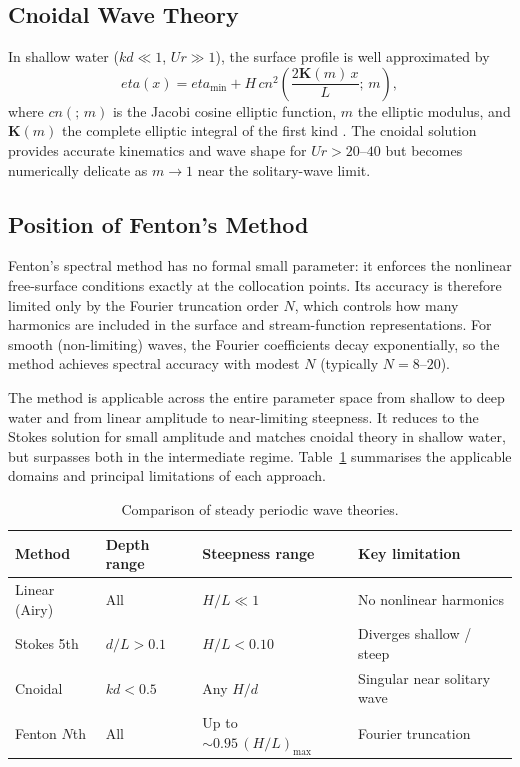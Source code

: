 \documentclass[journal,10pt,twocolumn]{IEEEtran}
\def\eta{eta}%
\def\mathrm#1{#1}%
\def\cdot{}%
\begin{document}
\subsection{Cnoidal Wave Theory}

In shallow water ($kd \ll 1$, $Ur \gg 1$), the surface profile is
well approximated by
\begin{equation}
    \eta(x) = \eta_{\min}
    + H\,\mathrm{cn}^2\!\left(\frac{2\mathbf{K}(m)\,x}{L};\,m\right),
\end{equation}
where $\mathrm{cn}(\cdot;\,m)$ is the Jacobi cosine elliptic function,
$m$ the elliptic modulus, and $\mathbf{K}(m)$ the complete elliptic
integral of the first kind \cite{KortewegDeVries1895}.
The cnoidal solution provides accurate kinematics and wave shape for
$Ur > 20$--$40$ but becomes numerically delicate as $m \to 1$ near
the solitary-wave limit.

\subsection{Position of Fenton's Method}

Fenton's spectral method has no formal small parameter: it enforces
the nonlinear free-surface conditions exactly at the collocation
points.
Its accuracy is therefore limited only by the Fourier truncation order
$N$, which controls how many harmonics are included in the surface
and stream-function representations.
For smooth (non-limiting) waves, the Fourier coefficients decay
exponentially, so the method achieves spectral accuracy with modest
$N$ (typically $N = 8$--$20$).

The method is applicable across the entire parameter space from
shallow to deep water and from linear amplitude to near-limiting
steepness.
It reduces to the Stokes solution for small amplitude and matches
cnoidal theory in shallow water, but surpasses both in the
intermediate regime.
Table~\ref{tab:comparison} summarises the applicable domains and
principal limitations of each approach.

\begin{table}[!t]
  \centering
  \caption{Comparison of steady periodic wave theories.}
  \label{tab:comparison}
  \renewcommand{\arraystretch}{1.25}
  \small
  \begin{tabular}{@{}lp{1.5cm}p{1.5cm}p{2.1cm}@{}}
    \toprule
    \textbf{Method} & \textbf{Depth range}
    & \textbf{Steepness range}
    & \textbf{Key limitation} \\
    \midrule
    Linear (Airy) & All & $H/L \ll 1$ & No nonlinear harmonics \\
    Stokes 5th    & $d/L > 0.1$  & $H/L < 0.10$ & Diverges shallow / steep \\
    Cnoidal       & $kd < 0.5$   & Any $H/d$    & Singular near solitary wave \\
    Fenton $N$th  & All & Up to $\sim\!0.95\,(H/L)_{\max}$ & Fourier truncation \\
    \bottomrule
  \end{tabular}
\end{table}
\end{document}

